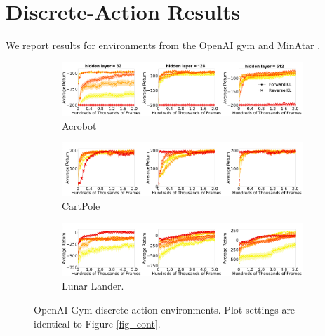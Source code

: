 \documentclass[\main/thesis.tex]{subfiles}
\begin{document}
\section{Discrete-Action Results}
We report results for environments from the OpenAI gym \citep{brockman2016openai} and MinAtar \citep{young2019minatar}. 



\begin{figure}[t]
  \centering
  \begin{subfigure}[b]{1\linewidth}
    \centering
    \includegraphics[width=\columnwidth]{figs/deep/discrete/acrobot_combined.png} 
    \caption{Acrobot}\label{fig:acrobot}
  \end{subfigure}%
  
  \begin{subfigure}[b]{1\linewidth}
    \centering
    \includegraphics[width=\columnwidth]{figs/deep/discrete/cartpole_combined.png}
    \caption{CartPole}\label{fig:cartpole}
  \end{subfigure}
  
  \begin{subfigure}[b]{1\linewidth}
    \centering
    \includegraphics[width=\columnwidth]{figs/deep/discrete/lunar_combined.png}
    \caption{Lunar Lander.}
    \label{fig:lunar-lander}
  \end{subfigure}
  \caption{OpenAI Gym discrete-action environments. Plot settings are identical to Figure \ref{fig_cont}.}\label{fig:open-ai}
\end{figure}
\end{document}

